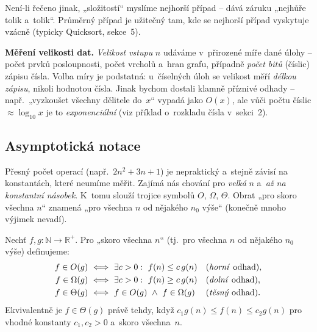 \documentclass[11pt,a4paper]{article}
\begin{document}
\begin{poznamka}
Není-li řečeno jinak, „složitostí`` myslíme nejhorší případ -- dává záruku „nejhůře tolik a~tolik``. Průměrný případ je užitečný tam, kde se nejhorší případ vyskytuje vzácně (typicky Quicksort, sekce~5).
\end{poznamka}

\begin{poznamka}
\textbf{Měření velikosti dat.} \emph{Velikost vstupu} $n$ udáváme v~přirozené míře dané úlohy -- počet prvků posloupnosti, počet vrcholů a~hran grafu, případně \emph{počet bitů} (číslic) zápisu čísla. Volba míry je podstatná: u~číselných úloh se velikost měří \emph{délkou zápisu}, nikoli hodnotou čísla. Jinak bychom dostali klamně příznivé odhady -- např.\ „vyzkoušet všechny dělitele do~$x$`` vypadá jako $O(x)$, ale vůči počtu číslic $\approx\log_{10}x$ je to \emph{exponenciální} (viz příklad o~rozkladu čísla v~sekci~2).
\end{poznamka}

\subsection{Asymptotická notace}

Přesný počet operací (např.\ $2n^2+3n+1$) je nepraktický a~stejně závisí na konstantách, které neumíme měřit. Zajímá nás chování pro \emph{velká} $n$ a~\emph{až na konstantní násobek}. K~tomu slouží trojice symbolů $O$, $\Omega$, $\Theta$. Obrat „pro skoro všechna $n$`` znamená „pro všechna $n$ od nějakého $n_0$ výše`` (konečně mnoho výjimek nevadí).

\begin{definice}
Nechť $f,g\colon\mathbb N\to\mathbb R^+$. Pro „skoro všechna $n$`` (tj.\ pro všechna $n$ od nějakého $n_0$ výše) definujeme:
\[
\begin{aligned}
f\in O(g)\ &\Longleftrightarrow\ \exists c>0:\ f(n)\le c\,g(n) &&\text{(\emph{horní} odhad)},\\
f\in \Omega(g)\ &\Longleftrightarrow\ \exists c>0:\ f(n)\ge c\,g(n) &&\text{(\emph{dolní} odhad)},\\
f\in \Theta(g)\ &\Longleftrightarrow\ f\in O(g)\ \wedge\ f\in\Omega(g) &&\text{(\emph{těsný} odhad)}.
\end{aligned}
\]
Ekvivalentně je $f\in\Theta(g)$ právě tehdy, když $c_1 g(n)\le f(n)\le c_2 g(n)$ pro vhodné konstanty $c_1,c_2>0$ a~skoro všechna~$n$.
\end{definice}
\end{document}
